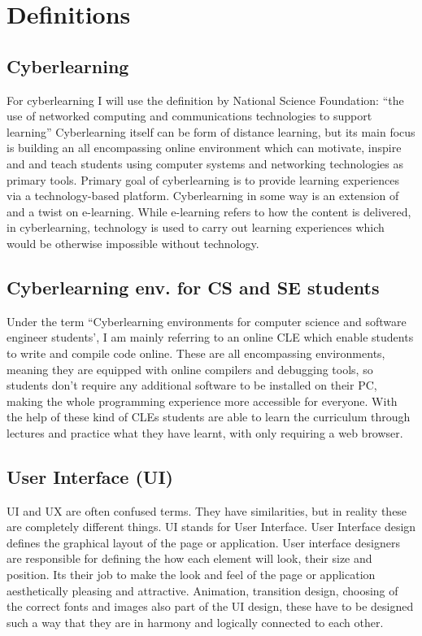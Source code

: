 \documentclass[10pt,english,a4paper]{article} %
\begin{document}
\section{Definitions}\label{definitions}

\subsection{Cyberlearning}
For cyberlearning I will use the definition by National Science Foundation: 
``the use of networked computing and communications technologies to support learning” \cite{borgman_2017_fostering} 
Cyberlearning itself can be form of distance learning, but its main focus is building an all 
encompassing online environment which can motivate, inspire and and teach students using 
computer systems and networking technologies as primary tools. \cite{ui/ux}
Primary goal of cyberlearning is to provide learning experiences via a technology-based platform. 
Cyberlearning in some way is an extension of and a twist on e-learning.\cite{lynch_2020_cyberlearning}
While e-learning refers to how the content is delivered, in cyberlearning, technology
is used to carry out learning experiences which would be otherwise impossible without technology.\cite{lynch_2020_cyberlearning}

\subsection{Cyberlearning env. for CS and SE students}
Under the term ``Cyberlearning environments for computer science and software engineer students', I am mainly
referring to an online CLE which enable students to write and compile code online. These are all encompassing
environments, meaning they are equipped with 
online compilers and debugging tools, so students don't require any additional software to be installed on their PC, making
the whole programming experience more accessible for everyone.
With the help of these kind of CLEs students are able to learn the curriculum through lectures and practice
what they have learnt, with only requiring a web browser.

\subsection{User Interface (UI)}
UI and UX are often confused terms. \cite{theymakedesign_2019_what} They have similarities, but in reality
these are completely different things.
UI stands for User Interface. User Interface design defines the graphical layout of the page or application.
User interface designers are responsible for defining the how each element will look, their size and position.
Its their job to make the look and feel of the page or application aesthetically pleasing and 
attractive. Animation, transition design, choosing of the correct fonts and images also part of the UI design, 
these have to be designed such a way that they are in harmony and logically connected to each other.
\cite{theymakedesign_2019_what}
\end{document}
